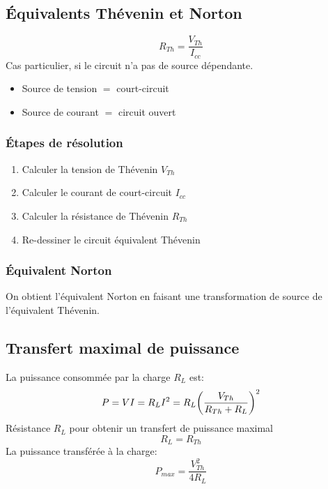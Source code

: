 \subsection{Équivalents Thévenin et Norton}
\begin{equation*}
    R_{Th}=\frac{V_{Th}}{I_{cc}}
\end{equation*}
Cas particulier, si le circuit n'a pas de source dépendante. 
\begin{itemize}[nosep]
    \item Source de tension $=$ court-circuit
    \item Source de courant $=$ circuit ouvert
\end{itemize}
\subsubsection{Étapes de résolution}
\begin{enumerate}
    \item Calculer la tension de Thévenin $V_{Th}$
    \item Calculer le courant de court-circuit $I_{cc}$
    \item Calculer la résistance de Thévenin $R_{Th}$
    \item Re-dessiner le circuit équivalent Thévenin
\end{enumerate}

\subsubsection{Équivalent Norton}
On obtient l'équivalent Norton en faisant une transformation de source de l'équivalent Thévenin.


\subsection{Transfert maximal de puissance}
La puissance consommée par la charge $R_L$ est: 
\begin{equation*}
    P = VI = R_L I^2 = R_L \qty(\frac{V_{Th}}{R_{Th}+R_L})^2
\end{equation*}
Résistance $R_L$ pour obtenir un transfert de puissance maximal
\begin{equation*}
    R_L = R_{Th}
\end{equation*}
La puissance transférée à la charge:
\begin{equation*}
    P_{max} = \frac{V^2_{Th}}{4R_L}
\end{equation*}
